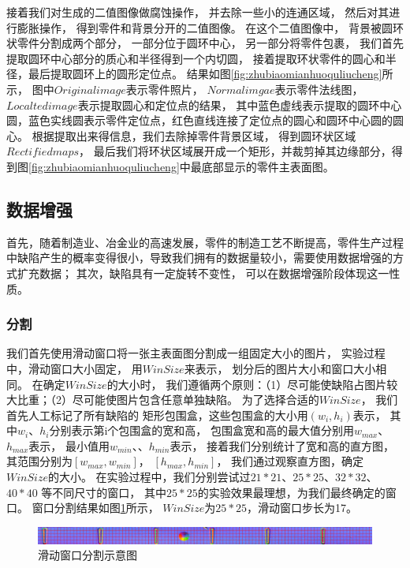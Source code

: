 接着我们对生成的二值图像做腐蚀操作，
并去除一些小的连通区域，
然后对其进行膨胀操作，
得到零件和背景分开的二值图像。
在这个二值图像中，
背景被圆环状零件分割成两个部分，
一部分位于圆环中心，
另一部分将零件包裹，
我们首先提取圆环中心部分的质心和半径得到一个内切圆，
接着提取环状零件的圆心和半径，最后提取圆环上的圆形定位点。
结果如图\ref{fig:zhubiaomianhuoquliucheng}所示，
图中$Original image$表示零件照片，
$Normal imgae$表示零件法线图，
$Localted image$表示提取圆心和定位点的结果，
其中蓝色虚线表示提取的圆环中心圆，蓝色实线圆表示零件定位点，红色直线连接了定位点的圆心和圆环中心圆的圆心。
根据提取出来得信息，我们去除掉零件背景区域，
得到圆环状区域$Rectified maps$，
最后我们将环状区域展开成一个矩形，并裁剪掉其边缘部分，得到图\ref{fig:zhubiaomianhuoquliucheng}中最底部显示的零件主表面图。

\subsection{数据增强}
\label{subsection:shujuzengqiang}

首先，随着制造业、冶金业的高速发展，零件的制造工艺不断提高，零件生产过程中缺陷产生的概率变得很小，导致我们拥有的数据量较小，需要使用数据增强的方式扩充数据；
其次，缺陷具有一定旋转不变性，
可以在数据增强阶段体现这一性质。

\subsubsection{分割}
\label{subsubssection:chuantongfenge}

我们首先使用滑动窗口将一张主表面图分割成一组固定大小的图片，
实验过程中，滑动窗口大小固定，
用$WinSize$来表示，
划分后的图片大小和窗口大小相同。
在确定$WinSize$的大小时，
我们遵循两个原则：（1）尽可能使缺陷占图片较大比重；（2）尽可能使图片包含任意单独缺陷。
为了选择合适的$WinSize$，
我们首先人工标记了所有缺陷的
矩形包围盒，这些包围盒的大小用$(w_i,h_i)$表示，
其中$w_i$、$h_i$分别表示第i个包围盒的宽和高，
包围盒宽和高的最大值分别用${w}_{max}$、${h}_{max}$表示，
最小值用${w}_{min}$、、${h}_{min}$表示，
接着我们分别统计了宽和高的直方图，其范围分别为$[{w}_{max},{w}_{min}]$，
$[{h}_{max},{h}_{min}]$，
我们通过观察直方图，确定$WinSize$的大小。
在实验过程中，我们分别尝试过$21*21$、$25*25$、$32*32$、$40*40$
等不同尺寸的窗口，
其中$25*25$的实验效果最理想，为我们最终确定的窗口。
窗口分割结果如图\ref{fig:chuangkoufenge}所示，
$WinSize$为$25*25$，滑动窗口步长为17。
\begin{figure}[htbp]
\centering
\includegraphics[width=1.0\linewidth]{figures/chuangkoufengetu.png}
\caption{滑动窗口分割示意图}
\label{fig:chuangkoufenge}
\end{figure}

